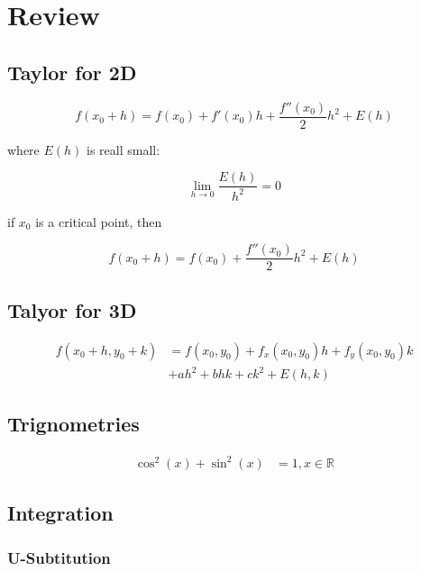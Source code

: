 \section{Review}

  \subsection{Taylor for 2D}

    \begin{equation}
      f\left( x_{0} + h \right)
        = f\left( x_{0} \right)
        + f'\left( x_{0} \right) h
        + \frac{f''\left( x_{0} \right)}{2} h^{2}
        + E\left( h \right)
    \end{equation}

    where $ E\left( h \right) $ is reall small:

    \begin{equation}
      \lim_{h \to 0} \frac{E\left( h \right)}{h^{2}} = 0
    \end{equation}

    if $ x_{0} $ is a critical point, then

    \begin{equation}
      f\left( x_{0} + h \right)
        = f\left( x_{0} \right)
        + \frac{f''\left( x_{0} \right)}{2} h^{2}
        + E\left( h \right)
    \end{equation}

  \subsection{Talyor for 3D}

    \begin{align*}
      f\left( x_{0} + h, y_{0} + k \right)
        &= f\left( x_{0}, y_{0} \right)
        + f_{x}\left( x_{0}, y_{0} \right) h
        + f_{y}\left( x_{0}, y_{0} \right) k \\
        &+ ah^{2} + bhk + ck^{2}
        + E\left( h, k \right)
    \end{align*}

  \subsection{Trignometries}

    \begin{align}
      \cos^{2}\left( x \right) + \sin^{2}\left( x \right) &= 1, x \in \mathbb{R}
    \end{align}

  \subsection{Integration}

    \subsubsection{U-Subtitution}